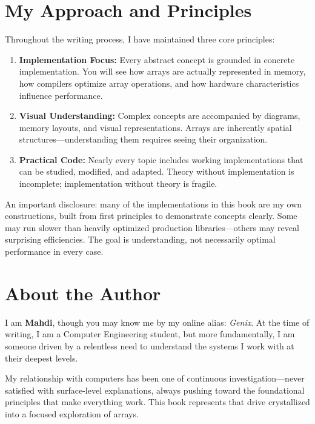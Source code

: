 \section*{My Approach and Principles}

Throughout the writing process, I have maintained three core principles:

\begin{enumerate}
	\item \textbf{Implementation Focus:} Every abstract concept is grounded in concrete implementation. You will see how arrays are actually represented in memory, how compilers optimize array operations, and how hardware characteristics influence performance.
	
	\item \textbf{Visual Understanding:} Complex concepts are accompanied by diagrams, memory layouts, and visual representations. Arrays are inherently spatial structures—understanding them requires seeing their organization.
	
	\item \textbf{Practical Code:} Nearly every topic includes working implementations that can be studied, modified, and adapted. Theory without implementation is incomplete; implementation without theory is fragile.
\end{enumerate}

An important disclosure: many of the implementations in this book are my own constructions, built from first principles to demonstrate concepts clearly. Some may run slower than heavily optimized production libraries—others may reveal surprising efficiencies. The goal is understanding, not necessarily optimal performance in every case.

\section*{About the Author}

I am \textbf{Mahdi}, though you may know me by my online alias: \emph{Genix}. At the time of writing, I am a Computer Engineering student, but more fundamentally, I am someone driven by a relentless need to understand the systems I work with at their deepest levels.

My relationship with computers has been one of continuous investigation—never satisfied with surface-level explanations, always pushing toward the foundational principles that make everything work. This book represents that drive crystallized into a focused exploration of arrays.

